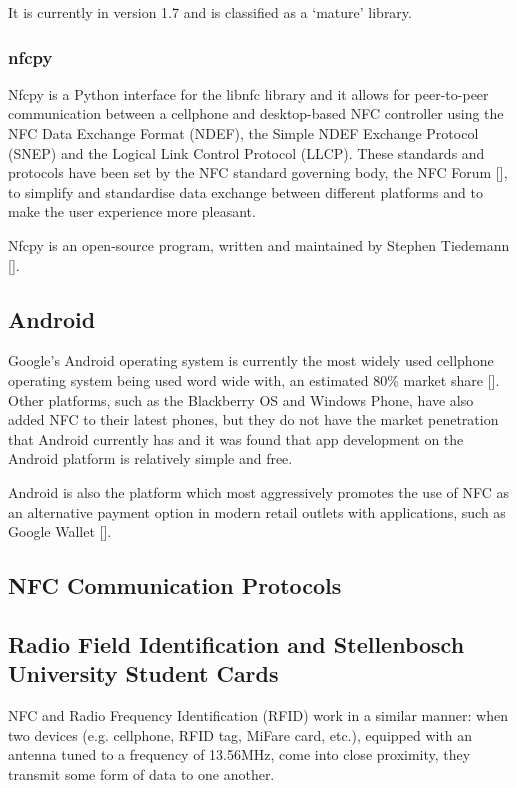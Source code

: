 It is currently in version 1.7 and is classified as a `mature' library. 

\subsubsection{nfcpy}
\label{sec:nfcpy}

Nfcpy is a Python interface for the libnfc library and it allows for peer-to-peer communication
between a cellphone and desktop-based NFC controller using the NFC Data Exchange Format
(NDEF), the Simple NDEF Exchange Protocol (SNEP) and the Logical Link Control Protocol (LLCP).
These standards and protocols have been set by the NFC standard governing body, the NFC Forum
[\cite{website:nfc-forum}], to simplify and standardise data exchange between different
platforms and to make the user experience more pleasant.

Nfcpy is an open-source program, written and maintained by Stephen Tiedemann
[\cite{website:nfcpy}].

\subsection{Android}

Google's Android operating system is currently the most widely used cellphone operating system
being used word wide with, an estimated 80\% market share [\cite{article:android-marketshare}].
Other platforms, such as the Blackberry OS and Windows Phone, have also added NFC to their
latest phones, but they do not have the market penetration that Android currently has and it
was found that app development on the Android platform is relatively simple and free. 

Android is also the platform which most aggressively promotes the use of NFC as an alternative 
payment option in modern retail outlets with applications, such as Google Wallet
[\cite{article:android-wallet}].

\subsection{NFC Communication Protocols}

\subsection{Radio Field Identification and Stellenbosch
University Student Cards}

NFC and Radio Frequency Identification (RFID) work in a similar manner: when two
devices  (e.g. cellphone, RFID tag, MiFare card, etc.), equipped with an antenna tuned to a
frequency  of 13.56MHz, come into close proximity, they transmit some form of data to one another.

